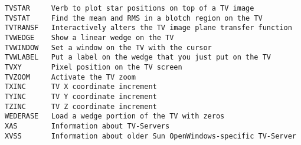 \begin{verbatim}
TVSTAR     Verb to plot star positions on top of a TV image
TVSTAT     Find the mean and RMS in a blotch region on the TV
TVTRANSF   Interactively alters the TV image plane transfer function
TVWEDGE    Show a linear wedge on the TV
TVWINDOW   Set a window on the TV with the cursor
TVWLABEL   Put a label on the wedge that you just put on the TV
TVXY       Pixel position on the TV screen
TVZOOM     Activate the TV zoom
TXINC      TV X coordinate increment
TYINC      TV Y coordinate increment
TZINC      TV Z coordinate increment
WEDERASE   Load a wedge portion of the TV with zeros
XAS        Information about TV-Servers
XVSS       Information about older Sun OpenWindows-specific TV-Server
\end{verbatim}\eve

{}

